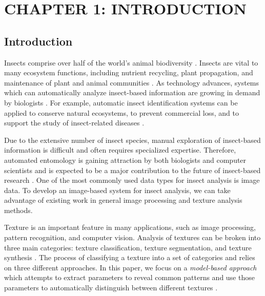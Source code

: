 \documentclass[12pt]{article}
\begin{document}
\begin{center}
    \listoftables
\end{center}
\newpage

\setlength{\parskip}{\baselineskip}

\section{CHAPTER 1: INTRODUCTION}
\subsection{Introduction}

Insects comprise over half of the world's animal biodiversity
\cite{tihelka_evolution_2021}. Insects are vital to many ecosystem functions,
including nutrient recycling, plant propagation, and maintenance of plant and
animal communities \cite{gullan_insects_2009, berenbaum_bugs_1996}. As
technology advances, systems which can automatically analyze insect-based
information are growing in demand by biologists \cite{hassan_advances_2014}. For
example, automatic insect identification systems can be applied to conserve
natural ecosystems, to prevent commercial loss, and to support the study of
insect-related diseases \cite{xia_insect_2018, kaloudis_insect_2005,
    thenmozhi_crop_2019}.

Due to the extensive number of insect species, manual exploration of
insect-based information is difficult and often requires specialized expertise.
Therefore, automated entomology is gaining attraction by both biologists and
computer scientists and is expected to be a major contribution to the future of
insect-based research \cite{martineau_survey_2017}. One of the most commonly
used data types for insect analysis is image data. To develop an image-based
system for insect analysis, we can take advantage of existing work in general
image processing and texture analysis methods.

Texture is an important feature in many applications, such as image processing,
pattern recognition, and computer vision. Analysis of textures can be broken
into three main categories: texture classification, texture segmentation, and
texture synthesis \cite{reed_review_1993}. The process of classifying a texture
into a set of categories and relies on three different approaches. In this
paper, we focus on a \textit{model-based approach} which attempts to extract
parameters to reveal common patterns and use those parameters to automatically
distinguish between different textures \cite{maillard_texture_2003}.
\end{document}
